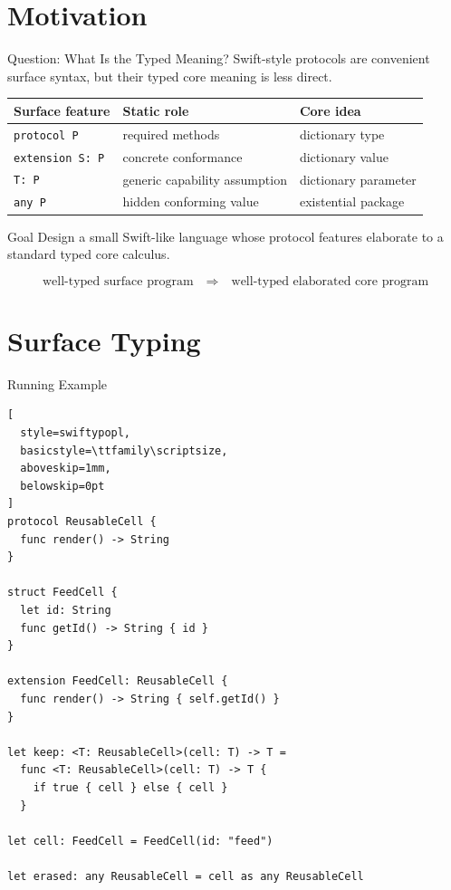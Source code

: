 \section{Motivation}

\begin{frame}{Question: What Is the Typed Meaning?}
\small
Swift-style protocols are convenient surface syntax, but their typed core
meaning is less direct.

\vspace{2mm}
\begin{center}
\setlength{\tabcolsep}{4pt}
\renewcommand{\arraystretch}{1.08}
\begin{tabular}{lll}
\toprule
Surface feature & Static role & Core idea \\
\midrule
\texttt{protocol P} & required methods & dictionary type \\
\texttt{extension S: P} & concrete conformance & dictionary value \\
\texttt{T: P} & generic capability assumption & dictionary parameter \\
\texttt{any P} & hidden conforming value & existential package \\
\bottomrule
\end{tabular}
\end{center}

\vspace{2mm}
\begin{block}{Goal}
Design a small Swift-like language whose protocol features elaborate to a
standard typed core calculus.
\end{block}

\[
  \text{well-typed surface program}
  \quad\Longrightarrow\quad
  \text{well-typed elaborated core program}
\]
\end{frame}

\section{Surface Typing}

\begin{frame}[fragile]{Running Example}
\begin{lstlisting}[
  style=swiftypopl,
  basicstyle=\ttfamily\scriptsize,
  aboveskip=1mm,
  belowskip=0pt
]
protocol ReusableCell {
  func render() -> String
}

struct FeedCell { 
  let id: String 
  func getId() -> String { id }
}

extension FeedCell: ReusableCell {
  func render() -> String { self.getId() }
}

let keep: <T: ReusableCell>(cell: T) -> T =
  func <T: ReusableCell>(cell: T) -> T {
    if true { cell } else { cell }
  }

let cell: FeedCell = FeedCell(id: "feed")

let erased: any ReusableCell = cell as any ReusableCell
\end{lstlisting}
\end{frame}


